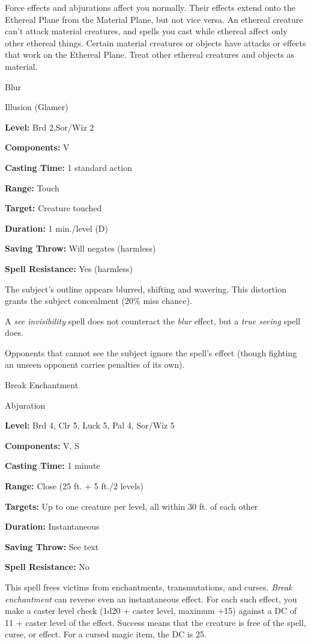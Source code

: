 \documentclass{article}
\begin{document}
Force effects and abjurations affect you normally. Their effects extend onto the 
Ethereal Plane from the Material Plane, but not vice versa. An ethereal creature 
can't attack material creatures, and spells you cast while ethereal affect only 
other ethereal things. Certain material creatures or objects have attacks or effects 
that work on the Ethereal Plane. Treat other ethereal creatures and objects as 
material.

\vspace{12pt}
Blur

Illusion (Glamer)

\textbf{Level:} Brd 2,Sor/Wiz 2

\textbf{Components:} V

\textbf{Casting Time:} 1 standard action

\textbf{Range:} Touch

\textbf{Target:} Creature touched

\textbf{Duration:} 1 min./level (D)

\textbf{Saving Throw: }Will negates (harmless)

\textbf{Spell Resistance:} Yes (harmless)

The subject's outline appears blurred, shifting and wavering. This distortion grants 
the subject concealment (20\% miss chance).

A \textit{see invisibility }spell does not counteract the \textit{blur }effect, 
but a \textit{true seeing }spell does.

Opponents that cannot see the subject ignore the spell's effect (though fighting 
an unseen opponent carries penalties of its own).

\vspace{12pt}
Break Enchantment

Abjuration

\textbf{Level:} Brd 4, Clr 5, Luck 5, Pal 4, Sor/Wiz 5

\textbf{Components:} V, S

\textbf{Casting Time:} 1 minute

\textbf{Range:} Close (25 ft. + 5 ft./2 levels)

\textbf{Targets:} Up to one creature per level, all within 30 ft. of each other

\textbf{Duration:} Instantaneous

\textbf{Saving Throw:} See text

\textbf{Spell Resistance:} No

This spell frees victims from enchantments, transmutations, and curses. \textit{Break 
enchantment }can reverse even an instantaneous effect. For each such effect, you 
make a caster level check (1d20 + caster level, maximum +15) against a DC of 11 
+ caster level of the effect. Success means that the creature is free of the spell, 
curse, or effect. For a cursed magic item, the DC is 25.
\end{document}
